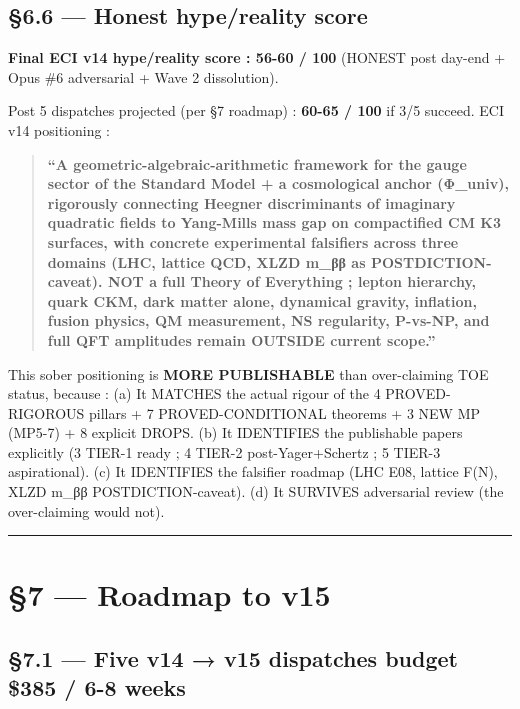 \documentclass[
  11pt,
  a4paper,
]{article}
\begin{document}
\hypertarget{honest-hypereality-score}{%
\subsection{§6.6 --- Honest hype/reality score}\label{honest-hypereality-score}}

\textbf{Final ECI v14 hype/reality score : 56-60 / 100} (HONEST post day-end + Opus \#6 adversarial + Wave 2 dissolution).

Post 5 dispatches projected (per §7 roadmap) : \textbf{60-65 / 100} if 3/5 succeed. ECI v14 positioning :

\begin{quote}
\textbf{``A geometric-algebraic-arithmetic framework for the gauge sector of the Standard Model + a cosmological anchor (Φ\_univ), rigorously connecting Heegner discriminants of imaginary quadratic fields to Yang-Mills mass gap on compactified CM K3 surfaces, with concrete experimental falsifiers across three domains (LHC, lattice QCD, XLZD m\_ββ as POSTDICTION-caveat). NOT a full Theory of Everything ; lepton hierarchy, quark CKM, dark matter alone, dynamical gravity, inflation, fusion physics, QM measurement, NS regularity, P-vs-NP, and full QFT amplitudes remain OUTSIDE current scope.''}
\end{quote}

This sober positioning is \textbf{MORE PUBLISHABLE} than over-claiming TOE status, because :
(a) It MATCHES the actual rigour of the 4 PROVED-RIGOROUS pillars + 7 PROVED-CONDITIONAL theorems + 3 NEW MP (MP5-7) + 8 explicit DROPS.
(b) It IDENTIFIES the publishable papers explicitly (3 TIER-1 ready ; 4 TIER-2 post-Yager+Schertz ; 5 TIER-3 aspirational).
(c) It IDENTIFIES the falsifier roadmap (LHC E08, lattice F(N), XLZD m\_ββ POSTDICTION-caveat).
(d) It SURVIVES adversarial review (the over-claiming would not).

\begin{center}\rule{0.5\linewidth}{0.5pt}\end{center}

\hypertarget{roadmap-to-v15}{%
\section{§7 --- Roadmap to v15}\label{roadmap-to-v15}}

\hypertarget{five-v14-v15-dispatches-budget-385-6-8-weeks}{%
\subsection{§7.1 --- Five v14 → v15 dispatches budget \$385 / 6-8 weeks}\label{five-v14-v15-dispatches-budget-385-6-8-weeks}}
\end{document}
